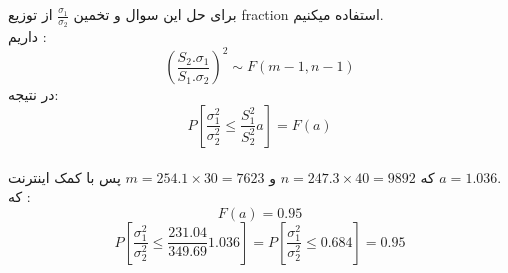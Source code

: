 \problem{}
برای حل این سوال و تخمین $\frac{\sigma_1}{\sigma_2}$
از توزیع fraction استفاده میکنیم.\\
داریم :\\
\[ (\frac{S_2 .\sigma_1}{S_1.\sigma_2})^2 \sim F(m-1,n-1) \]
در نتیجه:\\
\[ P[\frac{\sigma_1 ^2}{\sigma_2 ^2} \leq \frac{S_1 ^2}{S_2 ^2}a] = F(a)\]
\\
که $n = 247.3\times 40 = 9892 $ و $m = 254.1 \times 30 = 7623$
پس با کمک اینترنت $a = 1.036$.\\
که :\\
\[ F(a) = 0.95 \]
\[ P[\frac{\sigma_1 ^2}{\sigma_2 ^2} \leq \frac{231.04}{349.69}1.036] =
P[\frac{\sigma_1 ^2}{\sigma_2 ^2} \leq 0.684] = 0.95\]

